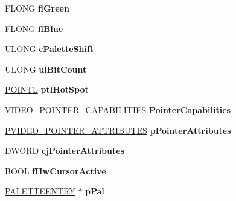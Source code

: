 \begin{DoxyCompactItemize}
\item 
\mbox{\label{struct___p_d_e_v_a548dc988fe29041ffe3cd856c1d2fe53}} 
F\+L\+O\+NG {\bfseries fl\+Green}
\item 
\mbox{\label{struct___p_d_e_v_ab131a7557c4cf4ca299a173139971a38}} 
F\+L\+O\+NG {\bfseries fl\+Blue}
\item 
\mbox{\label{struct___p_d_e_v_a12121ed4cb68ee25a413029aa1eee3d0}} 
U\+L\+O\+NG {\bfseries c\+Palette\+Shift}
\item 
\mbox{\label{struct___p_d_e_v_a53c49fee6910e8130a86d0d9b709a025}} 
U\+L\+O\+NG {\bfseries ul\+Bit\+Count}
\item 
\mbox{\label{struct___p_d_e_v_ad05de17ac8e0ad642dc1fbd704973b1d}} 
\hyperlink{struct___p_o_i_n_t_l}{P\+O\+I\+N\+TL} {\bfseries ptl\+Hot\+Spot}
\item 
\mbox{\label{struct___p_d_e_v_a04492ba3d7fca4e4ff1e11482557d452}} 
\hyperlink{struct___v_i_d_e_o___p_o_i_n_t_e_r___c_a_p_a_b_i_l_i_t_i_e_s}{V\+I\+D\+E\+O\+\_\+\+P\+O\+I\+N\+T\+E\+R\+\_\+\+C\+A\+P\+A\+B\+I\+L\+I\+T\+I\+ES} {\bfseries Pointer\+Capabilities}
\item 
\mbox{\label{struct___p_d_e_v_a4b86daeec7b64c2a6e92e23fd9cb2e56}} 
\hyperlink{struct___v_i_d_e_o___p_o_i_n_t_e_r___a_t_t_r_i_b_u_t_e_s}{P\+V\+I\+D\+E\+O\+\_\+\+P\+O\+I\+N\+T\+E\+R\+\_\+\+A\+T\+T\+R\+I\+B\+U\+T\+ES} {\bfseries p\+Pointer\+Attributes}
\item 
\mbox{\label{struct___p_d_e_v_a24bf9a27a0962dfd7e4c75076fd82a8b}} 
D\+W\+O\+RD {\bfseries cj\+Pointer\+Attributes}
\item 
\mbox{\label{struct___p_d_e_v_a63c02b602d95f4e1d7fb830b7b863954}} 
B\+O\+OL {\bfseries f\+Hw\+Cursor\+Active}
\item 
\mbox{\label{struct___p_d_e_v_a1ed41b63d2e06d439b9d6fb2a138f847}} 
\hyperlink{structtag_p_a_l_e_t_t_e_e_n_t_r_y}{P\+A\+L\+E\+T\+T\+E\+E\+N\+T\+RY} $\ast$ {\bfseries p\+Pal}
\item 

\end{DoxyCompactItemize}

